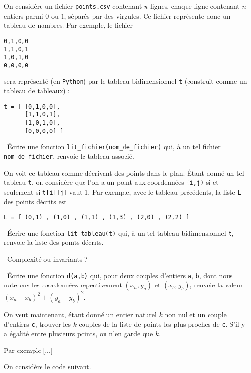 On considère un fichier \texttt{points.csv} contenant $n$ lignes, chaque ligne contenant $n$ entiers parmi $0$ ou $1$, séparés par des virgules. 
Ce fichier représente donc un tableau de nombres. 
Par exemple, le fichier 
\begin{verbatim}
0,1,0,0
1,1,0,1
1,0,1,0
0,0,0,0
\end{verbatim}
sera représenté (en \texttt{Python}) par le tableau bidimensionnel \texttt{t} (construit comme un tableau de tableaux) : 
\begin{verbatim}
t = [ [0,1,0,0],
      [1,1,0,1],
      [1,0,1,0],
      [0,0,0,0] ]
\end{verbatim}

\medskip

\question\ Écrire une fonction \texttt{lit\_fichier(nom\_de\_fichier)} qui, à un tel fichier \texttt{nom\_de\_fichier}, renvoie le tableau associé. 

\medskip 

On voit ce tableau comme décrivant des points dans le plan. Étant donné un tel tableau \texttt{t}, on considère que l'on a un point aux coordonnées \texttt{(i,j)} si et seulement si \texttt{t[i][j]} vaut 1. 
Par exemple, avec le tableau précédents, la liste \texttt{L} des points décrits est 
\begin{verbatim}
L = [ (0,1) , (1,0) , (1,1) , (1,3) , (2,0) , (2,2) ] 
\end{verbatim}

\medskip

\question\ Écrire une fonction \texttt{lit\_tableau(t)} qui, à un tel tableau bidimensionnel \texttt{t}, renvoie la liste des points décrits. 

\question\ Complexité ou invariants ? 

\medskip 

\question\ Écrire une fonction \texttt{d(a,b)} qui, pour deux couples d'entiers \texttt{a}, \texttt{b}, dont nous noterons les coordonnées repectivement $(x_a,y_a)$ et $(x_b,y_b)$, renvoie la valeur $(x_a-x_b)^2 + (y_a-y_b)^2$. 

\medskip

On veut maintenant, étant donné un entier naturel $k$ non nul et un couple d'entiers \texttt{c}, trouver les $k$ couples de la liste de points les plus proches de \texttt{c}. S'il y a égalité entre plusieurs points, on n'en garde que $k$. 

Par exemple [...]

\medskip

On considère le code suivant. 

